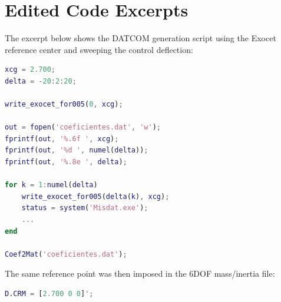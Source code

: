\appendix
\section{Edited Code Excerpts}

The excerpt below shows the DATCOM generation script using the Exocet reference center and sweeping the control deflection:

\begin{lstlisting}[language=Matlab]
xcg = 2.700;
delta = -20:2:20;

write_exocet_for005(0, xcg);

out = fopen('coeficientes.dat', 'w');
fprintf(out, '%.6f ', xcg);
fprintf(out, '%d ', numel(delta));
fprintf(out, '%.8e ', delta);

for k = 1:numel(delta)
    write_exocet_for005(delta(k), xcg);
    status = system('Misdat.exe');
    ...
end

Coef2Mat('coeficientes.dat');
\end{lstlisting}

The same reference point was then imposed in the 6DOF mass/inertia file:

\begin{lstlisting}[language=Matlab]
% Same XCG used in DATCOM.
D.CRM = [2.700 0 0]';
\end{lstlisting}
